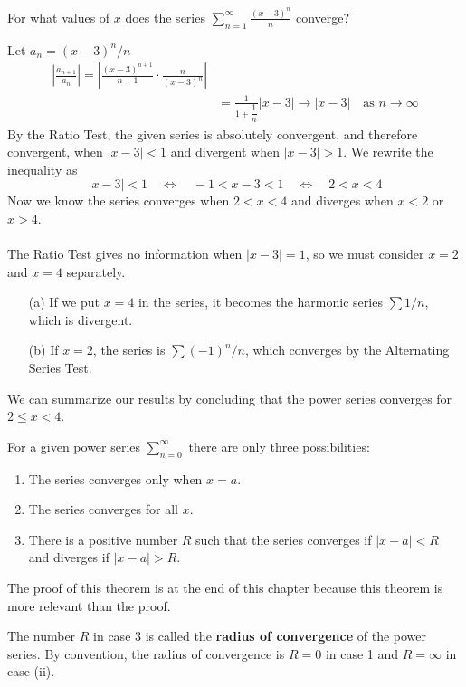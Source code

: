   \begin{example}
    For what values of $x$ does the series $\displaystyle \sum_{n=1}^{\infty} \frac{(x-3)^n}{n}$ converge?
  \end{example}
  \begin{solution}
    Let $a_n = (x-3)^n/n$
    \begin{align*}
      \left|\frac{a_{n+1}}{a_n}\right| = \left| \frac{(x-3)^{n+1}}{n+1} \cdot \frac{n}{(x-3)^n} \right| \\
      &= \frac{1}{1+\dfrac{1}{n}} |x-3| \to |x-3| \quad\text{as } n\to\infty
    \end{align*}
    By the Ratio Test, the given series is absolutely convergent, and therefore convergent, when $|x-3|<1$ and divergent when $|x-3|>1$. We rewrite the inequality as
    $$ |x-3|<1 \quad\Longleftrightarrow\quad -1<x-3<1 \quad\Longleftrightarrow\quad 2<x<4 $$
    Now we know the series converges when $2<x<4$ and diverges when $x<2$ or $x>4$.
    \\~\\
    The Ratio Test gives no information when $|x-3|=1$, so we must consider $x=2$ and $x=4$ separately.
    \begin{enumerate}
    \item[(a)] If we put $x=4$ in the series, it becomes the harmonic series $\sum 1/n$, which is divergent.
    \item[(b)] If $x=2$, the series is $\sum (-1)^n/n$, which converges by the Alternating Series Test.
    \end{enumerate}
    We can summarize our results by concluding that the power series converges for $2 \leq x < 4$.
  \end{solution}
  \begin{theorem}
    For a given power series $\displaystyle \sum_{n=0}^{\infty}$ there are only three possibilities:
    \begin{enumerate}
      \item The series converges only when $x=a$.
      \item The series converges for all $x$.
      \item There is a positive number $R$ such that the series converges if $|x-a|<R$ and diverges if $|x-a|>R$.
    \end{enumerate}
    The proof of this theorem is at the end of this chapter because this theorem is more relevant than the proof.
  \end{theorem}
  The number $R$ in case 3 is called the \textbf{radius of convergence} of the power series. By convention, the radius of convergence is $R=0$ in case 1 and $R=\infty$ in case (ii).\par
